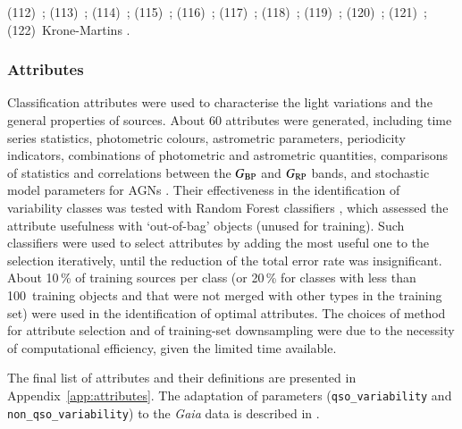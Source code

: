 \documentclass[longauth]{aa}
\def\gaia{\textit{Gaia}\xspace}
\def\bp{$G_{\rm BP}$\xspace}
\def\rp{$G_{\rm RP}$\xspace}
\begin{document}
\begin{table}
{(112)~\citet{2020svos.conf...11E};
(113)~\citet{2005ApJ...631.1100G};
(114)~\citet{2012ApJ...750L..28H,2013MNRAS.436.3573H,2013ApJ...765..102H};
(115)~\citet{2014MNRAS.442.2278K};
(116)~\citet{2013MNRAS.432.1632K};
(117)~\citet{2009ApJ...690..560N};
(118)~\citet{2007ApJS..171..219Q};
(119)~\citet{2016ApJ...817...27W};
(120)~\citet{2020MNRAS.496.3257B};
(121)~\citet{2020IAUS..345..378V};
(122)~Krone-Martins \citep[catalogue GAIA\_GAL\_GAIA\_2018 in][]{DR3-DPACP-177}.
}
\end{table}


\subsubsection{Attributes\label{sssec:attributes}}

Classification attributes were used to characterise the light variations and the general properties of sources. About 60 attributes were generated, including time series statistics, photometric colours, astrometric parameters, periodicity indicators, combinations of photometric and astrometric quantities, comparisons of statistics and correlations between the \bp and \rp bands, and stochastic model parameters for AGNs \citep{2011AJ....141...93B}. Their effectiveness in the identification of variability classes was tested with Random Forest classifiers \citep{Breiman.Random.Forest}, which assessed the attribute usefulness with `out-of-bag' objects (unused for training).  Such classifiers were used to select attributes by adding the most useful one to the selection iteratively, until the reduction of the total error rate was insignificant. About 10\,\% of training sources per class (or 20\,\% for classes with less than 100~training objects and that were not merged with other types in the training set) were used in the identification of optimal attributes. 
The choices of method for attribute selection and of training-set downsampling were due to the necessity of computational efficiency, given the limited time available.

The final list of attributes and their definitions are presented in Appendix~\ref{app:attributes}. 
The adaptation of \citet{2011AJ....141...93B} parameters (\texttt{qso\_variability} and \texttt{non\_qso\_variability}) to the \gaia data is described in \citet{DR3-DPACP-167}.
\end{document}
